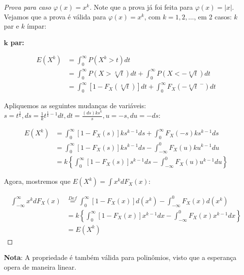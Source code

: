 \documentclass[
]{article}
\theoremstyle{definition}
\theoremstyle{definition}
\theoremstyle{definition}
\theoremstyle{definition}
\theoremstyle{remark}
\begin{document}
\begin{proof}[Prova para caso $\varphi(x) = x^{k}$]
Note que a prova já foi feita para \(\varphi(x) = |x|\). Vejamos que a prova é válida para \(\varphi(x) = x^{k}\), com \(k = 1,2,\ldots\), em 2 casos: \(k\) par e \(k\) ímpar:

\textbf{\(\mathbf{k}\) par:}

\begin{align*}
E(X^{k}) &= \int_{0}^{\infty}P\left(X^{k} > t\right)dt \\
&= \int_{0}^{\infty}P\left(X > \sqrt[k]{t}\right)dt + \int_{0}^{\infty}P\left(X < - \sqrt[k]{t}\right)dt \\
&= \int_{0}^{\infty}\left[1 - F_{X}\left(\sqrt[k]{t}\right)\right]dt + \int_{0}^{\infty}F_{X}\left(-\sqrt[k]{t}^{\;-}\right)dt
\end{align*}

Apliquemos as seguintes mudanças de variáveis: \(s = t^{\frac{1}{k}}, ds = \frac{1}{k}t^{\frac{1}{k} - 1}dt, dt = \frac{(ds)ks^{k}}{s}, u = -s, du = -ds\):

\begin{align*}
E(X^{k}) &= \int_{0}^{\infty}\left[1-F_{X}(s)\right]ks^{k-1}ds + \int_{0}^{\infty}F_{X}(-s)ks^{k-1}ds \\
&= \int_{0}^{\infty}\left[1-F_{X}(s)\right]ks^{k-1}ds - \int_{-\infty}^{0}F_{X}(u)ku^{k-1}du \\
&= k\left\{\int_{0}^{\infty}[1 - F_{X}(s)]s^{k-1}ds - \int_{-\infty}^{0}F_{X}(u)u^{k-1}du\right\}
\end{align*}

Agora, mostremos que \(E(X^{k}) = \int x^{k}dF_{X}(x)\):

\begin{align*}
\int_{-\infty}^{\infty}x^{k}dF_{X}(x) &\stackrel{Def}{=} \int_{0}^{\infty}\left[1 - F_{X}(x)\right]d(x^{k}) - \int_{-\infty}^{0}F_{X}(x)d(x^{k}) \\
&= k\left\{\int_{0}^{\infty}[1 - F_{X}(x)]x^{k-1}dx - \int_{-\infty}^{0}F_{X}(x)x^{k-1}dx\right\} \\
&= E(X^{k})
\end{align*}
\end{proof}

\textbf{Nota}: A propriedade é também válida para polinômios, visto que a esperança opera de maneira linear.
\end{document}
